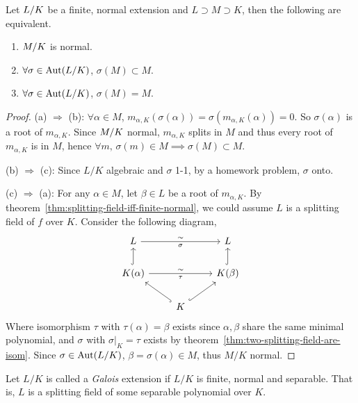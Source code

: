 \begin{prop} \label{prop:TFAE-of-normal-extension}
  Let ${L}/{K}$ be a finite, normal extension and $L \supset M \supset K$, then the following
  are equivalent.

  \begin{enumerate}[(\alph*)]
    \item ${M}/{K}$ is normal.
    \item $\forall \sigma \in \operatorname{Aut}({L}/{K})$, $\sigma(M) \subset M$.
    \item $\forall \sigma \in \operatorname{Aut}({L}/{K})$, $\sigma(M) = M$.
  \end{enumerate}

  \begin{proof}
    (a) $\Rightarrow$ (b): $\forall \alpha \in M$, $m_{\alpha, K}(\sigma(\alpha)) = \sigma(m_{\alpha, K}(\alpha)) = 0$.
    So $\sigma(\alpha)$ is a root of $m_{\alpha, K}$. Since ${M}/{K}$ normal, $m_{\alpha, K}$ splits in $M$
    and thus every root of $m_{\alpha, K}$ is in $M$, hence $\forall m, \, \sigma(m) \in M \implies \sigma(M) \subset M$.

    (b) $\Rightarrow$ (c): Since $L/K$ algebraic and $\sigma$ 1-1, by a homework problem, $\sigma$ onto.

    (c) $\Rightarrow$ (a): For any $\alpha \in M$, let $\beta \in L$ be a root of $m_{\alpha, K}$.
    By theorem~\ref{thm:splitting-field-iff-finite-normal}, we could assume $L$ is a splitting field of $f$ over $K$.
    Consider the following diagram,
    \[
      \begin{tikzcd}
        L \arrow[rr, "\sim", "\sigma"'] & & L \\
        K(\alpha) \arrow[u, hookrightarrow] \arrow[rr, "\sim", "\tau"'] & & K(\beta) \arrow[u, hookrightarrow] \\
        & K \arrow[ur, hookrightarrow] \arrow[ul, hookrightarrow] &
      \end{tikzcd}
    \]
    Where isomorphism $\tau$ with $\tau(\alpha) = \beta$ exists since $\alpha, \beta$ share the same minimal polynomial,
    and $\sigma$ with $\sigma\big|_K = \tau$ exists by theorem~\ref{thm:two-splitting-field-are-isom}.
    Since $\sigma \in \operatorname{Aut}({L}/{K})$, $\beta = \sigma(\alpha) \in M$, thus $M/K$ normal.
  \end{proof}
\end{prop}

\begin{definition}
  Let $L/K$ is called a \emph{Galois} extension if $L/K$ is finite, normal and separable.
  That is, $L$ is a splitting field of some separable polynomial over $K$.
\end{definition}

